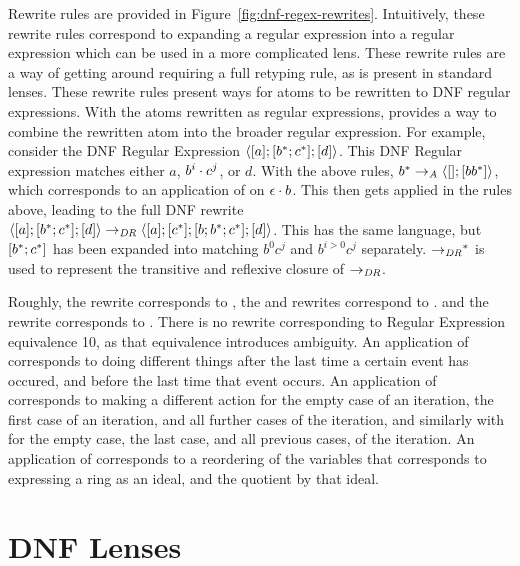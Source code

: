\documentclass[numbers]{sigplanconf}
\begin{document}
Rewrite rules are provided in Figure~\ref{fig:dnf-regex-rewrites}.
Intuitively, these rewrite rules correspond to expanding a regular expression
into a regular expression which can be used in a more complicated lens.
These rewrite rules are a way of getting around
requiring a full retyping rule, as is present in standard lenses.
These rewrite rules present ways for atoms to be rewritten to DNF regular
expressions.  With the atoms rewritten as regular expressions, \AtomDNFRewriteRule{}
provides a way to combine the rewritten atom into the broader regular
expression.  For example, consider the DNF Regular
Expression $\langle[ a];[{b}^*;{c}^*];[ d]\rangle$.
This DNF Regular expression matches either $a$, $b^i\cdot c^j$, or $d$.
With the above rules,
${b}^*\rightarrow_{\mathit{A}}\langle[];[ b{b}^*]\rangle$, which
corresponds to an application of \ProductstarRule{} on $\epsilon\cdot b$.
This then gets applied in the rules above, leading to the full DNF rewrite
$\langle[ a];[{b}^*;{c}^*];[ d]\rangle
\rightarrow_{\mathit{DR}}
\langle[ a];[{c}^*];[ b;{b}^*;{c}^*];[ d]\rangle$.
This has the same language, but $[{b}^*;{c}^*]$
has been expanded into matching $b^0c^j$ and $b^{i>0}c^j$ separately.
${\rightarrow_{\mathit{DR}}}^*$ is used to represent the transitive and
reflexive closure of $\rightarrow_{\mathit{DR}}$.

Roughly, the \AtomSumstarRule{} rewrite corresponds to \SumstarRule{},
the \AtomUnrollstarLeftRule{} and \AtomUnrollstarRightRule{} rewrites correspond to \ProductstarRule{}.
and the \DicyclicRewriteStarRule{} rewrite corresponds to \DicyclicityRule{}.
There is no rewrite corresponding to Regular Expression equivalence 10, as that
equivalence introduces ambiguity.
An application of \AtomSumstarRule{} corresponds to doing different things after the last time a certain event has occured, and before the last time that event occurs.
An application of \AtomUnrollstarLeftRule{} corresponds to making a different action for
the empty case of an iteration, the first case of an iteration, and all further cases of the iteration,
and similarly with \AtomUnrollstarRightRule{} for the empty case, the last case, and all previous cases, of the iteration.
An application of \DicyclicRewriteStarRule{} corresponds to a reordering of the
variables that corresponds to expressing a ring as an ideal, and the quotient by
that ideal.
\section{DNF Lenses}
\end{document}
